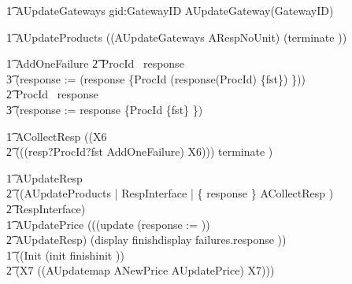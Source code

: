\begin{circus}
    \t1 AUpdateGateways \circdef \Interleave gid:GatewayID \circspot AUpdateGateway(GatewayID)

    \t1 AUpdateProducts \circdef ((AUpdateGateways \interleave ARespNoUnit) \circseq (terminate \then \Skip))

    \t1 AddOneFailure \circdef
        \t2 \lcircguard  ProcId \in \dom~response \rcircguard \circguard \\
            \t3 (response := (response \oplus \{ProcId \mapsto (response(ProcId) \cup \{fst\}) \}))
				\extchoice \\
        \t2 \lcircguard ProcId \notin \dom~response \rcircguard \circguard \\
            \t3 (response := response \cup \{ProcId \mapsto \{fst\} \})

        \t1 ACollectResp \circdef ((\circmu X6 \circspot \\
            \t2 (((resp?ProcId?fst \then  AddOneFailure) \circseq X6))) \extchoice terminate \then \Skip)

        \t1 AUpdateResp \circdef \\
            \t2 ((AUpdateProducts \lpar \emptyset | RespInterface | \{ response \} \rpar ACollectResp ) \\
            \t2 \circhide RespInterface) \\

        \t1 AUpdatePrice \circdef (((update \then (response := \emptyset)) \circseq \\
            \t2 AUpdateResp) \circseq (display \then finishdisplay \then failures.response \then \Skip)) \\

	\t1 \circspot  ((Init \circseq (init \then finishinit \then \Skip)) \circseq \\
    \t2 (\circmu X7 \circspot ((AUpdatemap \extchoice ANewPrice \extchoice AUpdatePrice) \circseq X7))) \\
	\circend
\end{circus}


